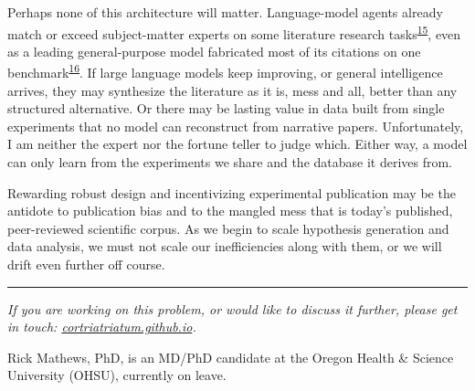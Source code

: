 \documentclass[12pt]{article}
\begin{document}
Perhaps none of this architecture will matter. Language-model agents already match or exceed subject-matter experts on some literature research tasks\textsuperscript{\hyperlink{ref-skarlinski2024}{15}}, even as a leading general-purpose model fabricated most of its citations on one benchmark\textsuperscript{\hyperlink{ref-asai2026}{16}}. If large language models keep improving, or general intelligence arrives, they may synthesize the literature as it is, mess and all, better than any structured alternative. Or there may be lasting value in data built from single experiments that no model can reconstruct from narrative papers. Unfortunately, I am neither the expert nor the fortune teller to judge which. Either way, a model can only learn from the experiments we share and the database it derives from.

Rewarding robust design and incentivizing experimental publication may be the antidote to publication bias and to the mangled mess that is today's published, peer-reviewed scientific corpus. As we begin to scale hypothesis generation and data analysis, we must not scale our inefficiencies along with them, or we will drift even further off course.

\vspace{14pt}
{\color{rule}\noindent\rule{0.3\textwidth}{0.4pt}}
\vspace{4pt}

{\fontsize{11.7}{16.38}\selectfont\setlength{\parindent}{0pt}\setlength{\parskip}{5pt}
{\itshape If you are working on this problem, or would like to discuss it further, please get in touch: \href{https://cortriatriatum.github.io/\#contact}{\upshape cortriatriatum.github.io}.}

Rick Mathews, PhD, is an MD/PhD candidate at the Oregon Health \& Science University (OHSU), currently on leave.

}
\end{document}
